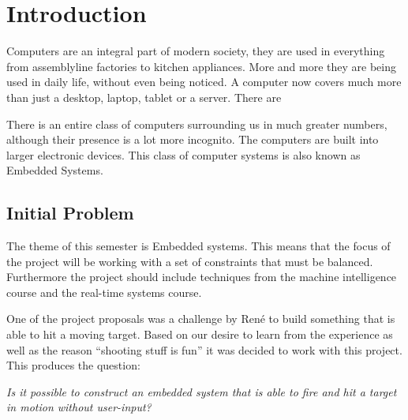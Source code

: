 \chapter{Introduction}

Computers are an integral part of modern society, they are used in everything
from assemblyline factories to kitchen appliances. More and more they are being
used in daily life, without even being noticed. A computer now covers much more
than just a desktop, laptop, tablet or a server. There are  

There is an entire class of
computers surrounding us in much greater numbers, although their presence is a
lot more incognito. The computers are built into larger electronic devices.
This class of computer systems is also known as Embedded Systems.


\section{Initial Problem}
The theme of this semester is Embedded systems. This means that the focus of
the project will be working with a set of constraints that must be balanced.
Furthermore the project should include techniques from the machine intelligence
course and the real-time systems course.\nl

One of the project proposals was a challenge by Ren\'e to build something that
is able to hit a moving target. Based on our desire to learn from the experience
as well as the reason ``shooting stuff is fun'' it was decided
to work with this project. This produces the question:\nl

\textit{Is it possible to construct an embedded system that is able to fire and hit
a target in motion without user-input?}
